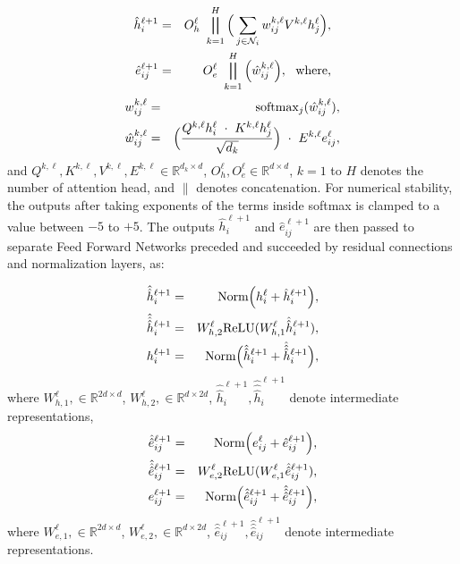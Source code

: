 \documentclass[letterpaper]{article} %
\begin{document}
\begin{eqnarray}
    \hat{h}_{i}^{\ell+1} &=& O_h^{\ell} \ \bigparallel_{k=1}^{H} \Big(\sum_{j \in \mathcal{N}_i} w_{ij}^{k,\ell} V^{k,\ell}h_j^{\ell} \Big), \label{eqn:gt_layer_edge_h}\\
    \hat{e}_{ij}^{\ell+1} &=& O_e^{\ell} \ \bigparallel_{k=1}^{H} \Big(\hat{w}_{ij}^{k,\ell} \Big), \ \ \textnormal{where,} \label{eqn:gt_layer_edge_e}
\end{eqnarray}
\begin{eqnarray}
    w_{ij}^{k,\ell} &=& \textnormal{softmax}_j ( \hat{w}_{ij}^{k,\ell} ), \label{eqn:softmax_edge_1}\\
    \hat{w}_{ij}^{k,\ell} &=& \Big( \frac{Q^{k, \ell} h_i^{\ell} \ \cdot \ K^{k, \ell}h_j^{\ell}}{\sqrt{d_k}} \Big)  \ \cdot \ E^{k,\ell} e^{\ell}_{ij} , \label{eqn:softmax_edge_2}
\end{eqnarray}
and $Q^{k,\ell}, K^{k,\ell}, V^{k,\ell}, E^{k,\ell} \in \mathbb{R}^{d_k \times d}$, $O_h^{\ell}, O_e^{\ell} \in \mathbb{R}^{d \times d}$, $k=1$ to $H$ denotes the number of attention head, and $\|$ denotes concatenation. 
For numerical stability, the outputs after taking exponents of the terms inside softmax is clamped to a value between $-5$ to $+5$.
The outputs $\hat{h}_{i}^{\ell+1}$ and $\hat{e}_{ij}^{\ell+1}$ are then passed to separate Feed Forward Networks preceded and succeeded by residual connections and normalization layers, as:

\begin{eqnarray}
    \hat{\hat{h}}_{i}^{\ell+1} &=& \textnormal{Norm} \Big( h_{i}^{\ell} + \hat{h}_{i}^{\ell+1} \Big), \label{eqn:rc_norm1_h}\\
    \hat{\hat{\hat{h}}}_{i}^{\ell+1} &=& W_{h,2}^{\ell} \textnormal{ReLU}(W_{h,1}^{\ell} \hat{\hat{h}}_{i}^{\ell+1}), \label{eqn:ffn_h}\\
    h_{i}^{\ell+1} &=& \textnormal{Norm} \Big( \hat{\hat{h}}_{i}^{\ell+1} + \hat{\hat{\hat{h}}}_{i}^{\ell+1} \Big), \label{eqn:rc_norm2_h}
\end{eqnarray}
where $W_{h,1}^{\ell}, \in \mathbb{R}^{2d \times d}$, $W_{h,2}^{\ell}, \in \mathbb{R}^{d \times 2d}$, $\hat{\hat{h}}_{i}^{\ell+1}, \hat{\hat{\hat{h}}}_{i}^{\ell+1}$ denote intermediate representations,
\begin{eqnarray}
    \hat{\hat{e}}_{ij}^{\ell+1} &=& \textnormal{Norm} \Big( e_{ij}^{\ell} + \hat{e}_{ij}^{\ell+1} \Big), \label{eqn:rc_norm1_e}\\
    \hat{\hat{\hat{e}}}_{ij}^{\ell+1} &=& W_{e,2}^{\ell} \textnormal{ReLU}(W_{e,1}^{\ell} \hat{\hat{e}}_{ij}^{\ell+1}), \label{eqn:ffn_e}\\
    e_{ij}^{\ell+1} &=& \textnormal{Norm} \Big( \hat{\hat{e}}_{ij}^{\ell+1} + \hat{\hat{\hat{e}}}_{ij}^{\ell+1} \Big), \label{eqn:rc_norm2_e}
\end{eqnarray}
where $W_{e,1}^{\ell}, \in \mathbb{R}^{2d \times d}$, $W_{e,2}^{\ell}, \in \mathbb{R}^{d \times 2d}$, $\hat{\hat{e}}_{ij}^{\ell+1}, \hat{\hat{\hat{e}}}_{ij}^{\ell+1}$ denote intermediate representations. 
\end{document}
